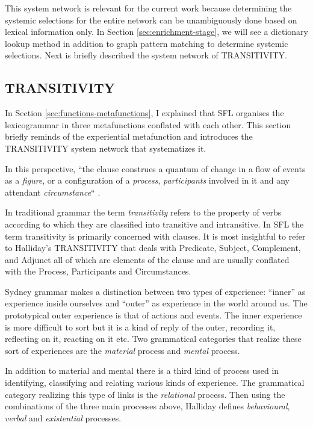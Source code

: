     This system network is relevant for the current work because determining the systemic selections for the entire network can be unambiguously done based on lexical information only. In Section \ref{sec:enrichment-stage}, we will see a dictionary lookup method in addition to graph pattern matching to determine systemic selections. Next is briefly described the system network of TRANSITIVITY. 
      
\subsection{TRANSITIVITY}
\label{sec:transitivity}
In Section \ref{sec:functions-metafunctions}, I explained that SFL organises the lexicogrammar in three metafunctions conflated with each other. This section briefly reminds of the experiential metafunction and introduces the TRANSITIVITY system network that systematizes it.

In this perspective, ``the clause construes a quantum of change in a flow of events as a \textit{figure}, or a configuration of a \textit{process}, \textit{participants} involved in it and any attendant \textit{circumstance}`` \citep[212]{Halliday2013}. 

In traditional grammar the term \textit{transitivity} refers to the property of verbs according to which they are classified into transitive and intransitive. In SFL the term transitivity is primarily concerned with clauses. It is most insightful to refer to Halliday's TRANSITIVITY \citep{Halliday67-parts1+2,Halliday68-part3,Halliday68} that deals with Predicate, Subject, Complement, and Adjunct all of which are elements of the clause and are usually conflated with the Process, Participants and Circumstances. 

Sydney grammar makes a distinction between two types of experience: ``inner'' as experience inside ourselves and ``outer'' as experience in the world around us. The prototypical outer experience is that of actions and events. The inner experience is more difficult to sort but it is a kind of reply of the outer, recording it, reflecting on it, reacting on it etc. Two grammatical categories that realize these sort of experiences are the \textit{material} process and \textit{mental} process.

In addition to material and mental there is a third kind of process used in identifying, classifying and relating various kinds of experience. The grammatical category realizing this type of links is the \textit{relational} process. Then using the combinations of the three main processes above, Halliday defines \textit{behavioural}, \textit{verbal} and \textit{existential} processes. 

